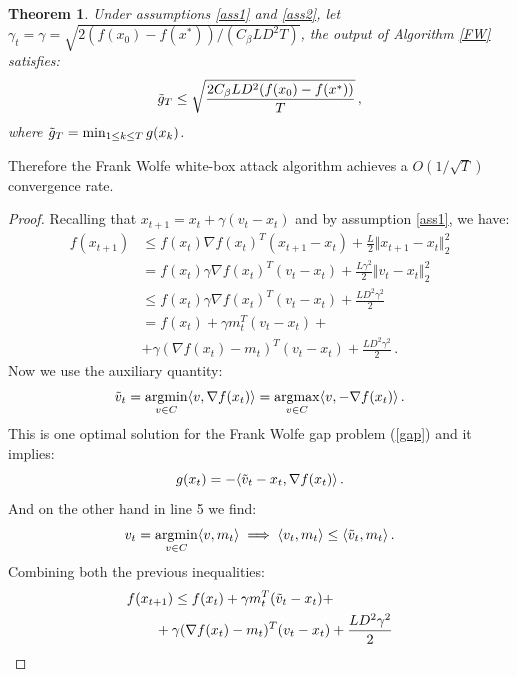 \documentclass[10pt,twocolumn,letterpaper, english]{article}
\newcommand{\argmin}{\mathop{\mathrm{argmin}}}
\newcommand{\argmax}{\mathop{\mathrm{argmax}}}
\theoremstyle{definition}
\theoremstyle{plain}
\newtheorem{theo}{Theorem}[subsection]
\theoremstyle{plain}
\theoremstyle{plain}
\theoremstyle{plain}
\theoremstyle{remark}
\theoremstyle{remark}
\theoremstyle{definition}
\theoremstyle{definition}
\theoremstyle{definition}
\theoremstyle{definition}
\begin{document}
\begin{theo}
Under assumptions \ref{ass1} and \ref{ass2}, let $\gamma_t= \gamma= \sqrt{2(f(x_0)- f(x^\ast))/(C_\beta L D^2 T )}$, the output of Algorithm \ref{FW} satisfies:
\begin{equation*}
    \Tilde{g}_T \le \sqrt{ \frac{2C_\beta L D^2 (f(x_0)- f(x^\ast))}{T}}\,,
\end{equation*}
where $ \Tilde{g}_T= \min_{1 \le k \le T}g(x_k)$. 
\end{theo}

Therefore the Frank Wolfe white-box attack algorithm achieves a $O(1/\sqrt{T})$ convergence rate.
\begin{proof}

Recalling that $x_{t+1} = x_t + \gamma (v_t-x_t)$ and by assumption \ref{ass1}, we have:
\begin{align*}
    f(x_{t+1}) & \le f(x_t) \nabla f(x_t)^T ( x_{t+1} - x_t) + \frac{L}{2} \Vert x_{t+1} - x_t \Vert_{2}^2 \\
    &= f(x_t) \gamma \nabla f(x_t)^T ( v_t - x_t) + \frac{L \gamma^2}{2} \Vert v_t - x_t \Vert_{2}^2\\
    & \le f(x_t) \gamma \nabla f(x_t)^T ( v_t - x_t) + \frac{L D^2 \gamma^2}{2}\\
    &= f(x_t) + \gamma m_{t}^T ( v_t - x_t) +\\
    &+ \gamma(\nabla f(x_t) - m_t)^T (v_t - x_t) + \frac{L D^2 \gamma^2}{2} \,.
\end{align*}
Now we use the auxiliary quantity:
\begin{equation*}
    \Tilde{v}_t = \argmin_{v \in C} \langle v, \nabla f(x_t) \rangle = \argmax_{v \in C} \langle v, -\nabla f(x_t) \rangle \,.
\end{equation*}
This is one optimal solution for the Frank Wolfe gap problem (\ref{gap}) and it implies:
\begin{equation*}
    g(x_t)= - \langle \Tilde{v}_t -x_t, \nabla f(x_t) \rangle \,.
\end{equation*}
And on the other hand in line 5 we find:
\begin{equation*}
    v_t= \argmin_{v \in C}\langle v,m_t \rangle \implies \langle v_t,m_t \rangle  \le  \langle \Tilde{v}_t, m_t \rangle \,.
\end{equation*}
Combining both the previous inequalities: 
\begin{align*}
    &f( x_{t+1}) \le f(x_t) + \gamma m_{t}^T ( \Tilde{v}_t - x_t) +\\
    &\qquad + \gamma (\nabla f(x_t) - m_t)^T (v_t - x_t) + \frac{L D^2 \gamma^2}{2} \\

\end{align*}
\end{proof}
\end{document}
